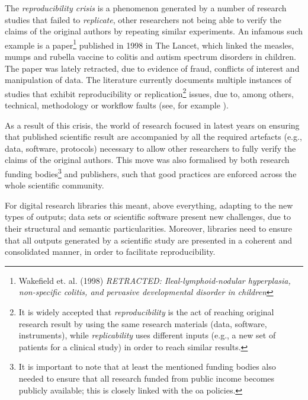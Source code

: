 The \emph{reproducibility crisis} is a phenomenon generated by a number of research studies that failed to \emph{replicate}, other researchers not being able to verify the claims of the original authors by repeating similar experiments. An infamous such example is a paper\footnote{Wakefield et. al. (1998) \emph{RETRACTED: Ileal-lymphoid-nodular hyperplasia, non-specific colitis, and pervasive developmental disorder in children}} published in 1998 in The Lancet, which linked the measles, mumps and rubella vaccine to colitis and autism spectrum disorders in children. The paper was lately retracted, due to evidence of fraud, conflicts of interest and manipulation of data. The literature currently documents multiple instances of studies that exhibit reproducibility or replication\footnote{It is widely accepted that \emph{reproducibility} is the act of reaching original research result by using the same research materials (data, software, instruments), while \emph{replicability} uses different inputs (e.g., a new set of patients for a clinical study) in order to reach similar results\cite{patil}.} issues, due to, among others, technical, methodology or workflow faults (see, for example \cite{eklund,seekblastn}).

As a result of this crisis, the world of research focused in latest years on ensuring that published scientific result are accompanied by all the required artefacts (e.g., data, software, protocols) necessary to allow other researchers to fully verify the claims of the original authors. This move was also formalised by both research funding bodies\cite{h2020,nih}\footnote{It is important to note that at least the mentioned funding bodies also needed to ensure that all research funded from public income becomes publicly available; this is closely linked with the \gls{oa} policies.} and publishers\cite{scidat,elsdat}, such that good practices are enforced across the whole scientific community.

For digital research libraries this meant, above everything, adapting to the new types of outputs; data sets or scientific software present new challenges, due to their structural and semantic particularities. Moreover, libraries need to ensure that all outputs generated by a scientific study are presented in a coherent and consolidated manner, in order to facilitate reproducibility.

